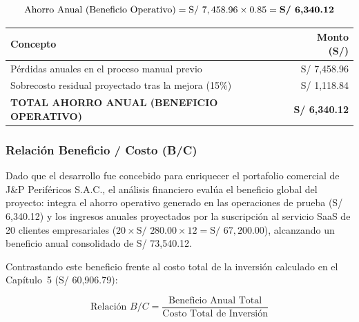 \begin{equation*}
    \text{Ahorro Anual (Beneficio Operativo)} = \text{S/ } 7,458.96 \times 0.85 = \text{\textbf{S/ 6,340.12}}
\end{equation*}

\par
\noindent
\begin{minipage}{\linewidth}

    \begingroup
    \renewcommand{\baselinestretch}{1}
    \footnotesize
    \setlength{\tabcolsep}{4pt}
    \renewcommand{\arraystretch}{1.25}

    \begin{tabularx}{\linewidth}{@{}X r@{}}
        \toprule
        \textbf{Concepto} & \textbf{Monto (S/)} \\ \midrule
        Pérdidas anuales en el proceso manual previo & S/ 7,458.96 \\ 
        Sobrecosto residual proyectado tras la mejora (15\%) & S/ 1,118.84 \\ \midrule
        \textbf{TOTAL AHORRO ANUAL (BENEFICIO OPERATIVO)} & \textbf{S/ 6,340.12} \\ \bottomrule
    \end{tabularx}
    \endgroup

\end{minipage}
\finBloqueAPA

\subsubsection{Relación Beneficio / Costo (B/C)}

Dado que el desarrollo fue concebido para enriquecer el portafolio comercial de J\&P Periféricos S.A.C., 
el análisis financiero evalúa el beneficio global del proyecto: integra el ahorro operativo generado en las operaciones de prueba (S/ 6,340.12) 
y los ingresos anuales proyectados por la suscripción al servicio SaaS de 20 clientes empresariales ($20 \times \text{S/ } 280.00 \times 12 = \text{S/ } 67,200.00$), 
alcanzando un beneficio anual consolidado de S/ 73,540.12.

Contrastando este beneficio frente al costo total de la inversión calculado en el Capítulo~5 (S/ 60,906.79):

\begin{equation}
    \text{Relación } B/C = \frac{\text{Beneficio Anual Total}}{\text{Costo Total de Inversión}}
\end{equation}


